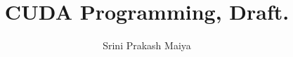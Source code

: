 \documentclass[14pt]{report}
\title{CUDA Programming, Draft.}
\author{Srini Prakash Maiya}
\begin{document}
\maketitle
\pagebreak
\tableofcontents
\pagebreak





\end{document}
